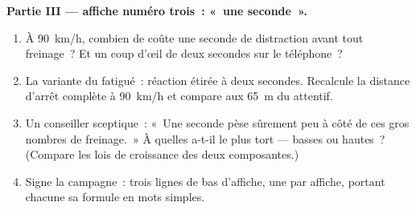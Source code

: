\begin{problem}
\medskip\noindent\textbf{Partie III --- affiche numéro trois~: «~une
seconde~».}
\begin{enumerate}[resume]
  \item À \qty{90}{km/h}, combien de  coûte une seconde de
        distraction avant tout freinage~? Et un coup d'œil de deux
        secondes sur le téléphone~?
  \item La variante du  fatigué~: réaction étirée à deux
        secondes. Recalcule la distance d'arrêt complète à
        \qty{90}{km/h} et compare aux \qty{65}{m} du 
        attentif.
  \item Un conseiller sceptique~: «~Une seconde pèse sûrement peu
        à côté de ces gros nombres de freinage.~» À quelles
         a-t-il le plus tort --- basses ou hautes~?
        (Compare les lois de croissance des deux composantes.)
  \item Signe la campagne~: trois lignes de bas d'affiche, une par
        affiche, portant chacune sa formule en mots simples.
\end{enumerate}
\end{problem}

